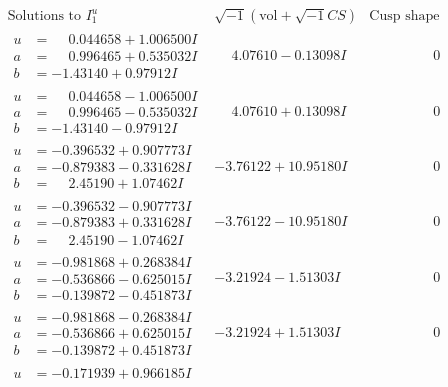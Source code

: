 \documentclass[1p]{elsarticle_modified}
\theoremstyle{definition}
\newcommand{\I}{\sqrt{-1}}
\begin{document}
$$\begin{array}{c|c|c}  
\text{Solutions to }I^u_{1}& \I (\text{vol} + \sqrt{-1}CS) & \text{Cusp shape}\\
 \hline 
\begin{aligned}
u &= \phantom{-}0.044658 + 1.006500 I \\
a &= \phantom{-}0.996465 + 0.535032 I \\
b &= -1.43140 + 0.97912 I\end{aligned}
 & \phantom{-}4.07610 - 0.13098 I & \phantom{-0.000000 } 0 \\ \hline\begin{aligned}
u &= \phantom{-}0.044658 - 1.006500 I \\
a &= \phantom{-}0.996465 - 0.535032 I \\
b &= -1.43140 - 0.97912 I\end{aligned}
 & \phantom{-}4.07610 + 0.13098 I & \phantom{-0.000000 } 0 \\ \hline\begin{aligned}
u &= -0.396532 + 0.907773 I \\
a &= -0.879383 - 0.331628 I \\
b &= \phantom{-}2.45190 + 1.07462 I\end{aligned}
 & -3.76122 + 10.95180 I & \phantom{-0.000000 } 0 \\ \hline\begin{aligned}
u &= -0.396532 - 0.907773 I \\
a &= -0.879383 + 0.331628 I \\
b &= \phantom{-}2.45190 - 1.07462 I\end{aligned}
 & -3.76122 - 10.95180 I & \phantom{-0.000000 } 0 \\ \hline\begin{aligned}
u &= -0.981868 + 0.268384 I \\
a &= -0.536866 - 0.625015 I \\
b &= -0.139872 - 0.451873 I\end{aligned}
 & -3.21924 - 1.51303 I & \phantom{-0.000000 } 0 \\ \hline\begin{aligned}
u &= -0.981868 - 0.268384 I \\
a &= -0.536866 + 0.625015 I \\
b &= -0.139872 + 0.451873 I\end{aligned}
 & -3.21924 + 1.51303 I & \phantom{-0.000000 } 0 \\ \hline\begin{aligned}
u &= -0.171939 + 0.966185 I \\

\end{aligned}
\end{array}$$
\end{document}
